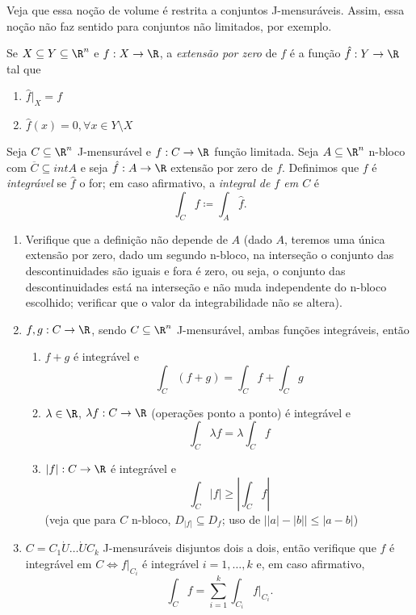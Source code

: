 Veja que essa noção de volume é restrita a conjuntos J-mensuráveis. Assim, essa noção não faz sentido para conjuntos não limitados, por exemplo.

\begin{definition}
    Se $X\subseteq Y \subseteq \R^{n}$ e $f:X \to \R$, a \emph{extensão por zero} de $f$ é a função $\hat{f}: Y \to  \R$ tal que
    \begin{enumerate}
        \item $\hat{f}|_X = f$
	\item $\hat{f}\left( x \right) = 0, \forall x\in Y\setminus X$
    \end{enumerate}
\end{definition}

\begin{definition}
    Seja $C\subseteq \R^{n}$ J-mensurável e $f:C\to \R$ função limitada. Seja $A \subseteq\R^{n}$ n-bloco com $\overline{C}\subseteq int A$ e seja $\hat{f}: A\to \R$ extensão por zero de $f$. Definimos que $f$ é \emph{integrável} se $\hat{f}$ o for; em caso afirmativo, a \emph{integral de $f$ em $C$} é \[
    \int_C f \coloneqq \int_A \hat{f}
    .\] 
\end{definition}

\begin{problem}
    \begin{enumerate}
	\item Verifique que a definição não depende de $A$ (dado $A$, teremos uma única extensão por zero, dado um segundo n-bloco, na interseção o conjunto das descontinuidades são iguais e fora é zero, ou seja, o conjunto das descontinuidades está na interseção e não muda independente do n-bloco escolhido; verificar que o valor da integrabilidade não se altera).
	\item $f,g: C \to \R$, sendo $C \subseteq\R^{n}$ J-mensurável, ambas funções integráveis, então 
	    \begin{enumerate}
	        \item $f+g$ é integrável e \[
	        \int_C \left( f+g \right)  = \int_C f + \int_C g
	        \] 
	    \item $\lambda\in \R$, $\lambda f : C \to \R$ (operações ponto a ponto) é integrável e \[
	    \int_C \lambda f = \lambda \int_C f
	    \] 
	    \item $\left| f \right| :C\to \R$ é integrável e \[
	    \int_C \left| f \right| \ge \left| \int_C f \right| 
	\] (veja que para $C$ n-bloco, $D_{\left| f \right| } \subseteq D_f$; uso de $\left| |a| - |b| \right| \le \left| a-b \right| $)
	    \end{enumerate}
	\item $C = C_1 \dot{U}\ldots \dot{U} C_k$ J-mensuráveis disjuntos dois a dois, então verifique que $f$ é integrável em $C \iff f|_{C_i}$ é integrável $i=1,\ldots,k$ e, em caso afirmativo, \[
	\int_C f = \sum_{i=1}^{k} \int_{C_i}f|_{C_i}
	.\] 
    \end{enumerate}
\end{problem}

